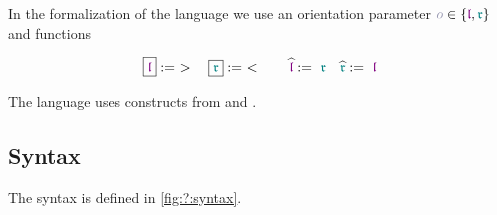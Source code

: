 In the formalization of the language we use an orientation parameter $\pol \in \{ \polprd,\polcon \}$ and functions

\begin{align*}
  \boxed{\polprd}
  :=\ >
  \quad
  \boxed{\polcon}
  :=\ <
  \qquad
  \widehat{\polprd}
  :=\ \polcon
  \quad
  \widehat{\polcon}
  :=\ \polprd
\end{align*}

The language uses constructs from \cite{10.1145/3428194} and \cite{10.1145/2858949.2784763}.

\subsection{Syntax}

The syntax is defined in \cref{fig:?:syntax}.

